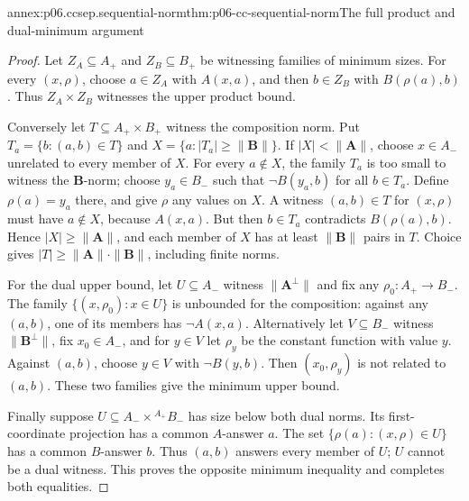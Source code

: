 \begin{annexitem}{annex:p06.ccsep.sequential-norm}{thm:p06-cc-sequential-norm}{The full product and dual-minimum argument}
\begin{proof}
Let \(Z_A\subseteq A_+\) and \(Z_B\subseteq B_+\) be witnessing
families of minimum sizes. For every \((x,\rho)\), choose
\(a\in Z_A\) with \(A(x,a)\), and then \(b\in Z_B\) with
\(B(\rho(a),b)\). Thus \(Z_A\times Z_B\) witnesses the upper
product bound.

Conversely let \(T\subseteq A_+\times B_+\) witness the composition
norm. Put \(T_a=\{b:(a,b)\in T\}\) and
\(X=\{a:|T_a|\geq\|\mathbf B\|\}\). If \(|X|<\|\mathbf A\|\), choose
\(x\in A_-\) unrelated to every member of \(X\). For every
\(a\notin X\), the family \(T_a\) is too small to witness the
\(\mathbf B\)-norm; choose \(y_a\in B_-\) such that
\(\neg B(y_a,b)\) for all \(b\in T_a\). Define \(\rho(a)=y_a\)
there, and give \(\rho\) any values on \(X\). A witness
\((a,b)\in T\) for \((x,\rho)\) must have \(a\notin X\), because
\(A(x,a)\). But then \(b\in T_a\) contradicts
\(B(\rho(a),b)\). Hence \(|X|\geq\|\mathbf A\|\), and each member of
\(X\) has at least \(\|\mathbf B\|\) pairs in \(T\). Choice gives
\(|T|\geq\|\mathbf A\|\cdot\|\mathbf B\|\), including finite norms.

For the dual upper bound, let \(U\subseteq A_-\) witness
\(\|\mathbf A^\perp\|\) and fix any \(\rho_0:A_+\to B_-\). The family
\(\{(x,\rho_0):x\in U\}\) is unbounded for the composition:
against any \((a,b)\), one of its members has \(\neg A(x,a)\).
Alternatively let \(V\subseteq B_-\) witness \(\|\mathbf B^\perp\|\),
fix \(x_0\in A_-\), and for \(y\in V\) let \(\rho_y\) be the
constant function with value \(y\). Against \((a,b)\), choose
\(y\in V\) with \(\neg B(y,b)\). Then
\((x_0,\rho_y)\) is not related to \((a,b)\). These two families
give the minimum upper bound.

Finally suppose \(U\subseteq A_-\times{}^{A_+}B_-\) has size below
both dual norms. Its first-coordinate projection has a common
\(A\)-answer \(a\). The set \(\{\rho(a):(x,\rho)\in U\}\)
has a common \(B\)-answer \(b\). Thus \((a,b)\) answers every
member of \(U\); \(U\) cannot be a dual witness. This proves the
opposite minimum inequality and completes both equalities.
\end{proof}
\end{annexitem}

